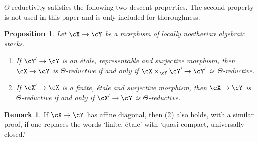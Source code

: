 \documentclass[a4paper]{amsart}
\numberwithin{equation}{section}
\theoremstyle{plain}
\newtheorem{prop}[thm]{Proposition}
\theoremstyle{definition}
\newtheorem{remark}[thm]{Remark}
\begin{document}
$\Theta$-reductivity satisfies the following two descent properties.  The second property is not used in this paper and is only included for thoroughness.

\begin{prop} \label{P:theta-reductiveheta-reductive-descent} Let $\cX \to \cY$ be a morphism of locally noetherian algebraic stacks.
\begin{enumerate}
\item  If $\cY' \to \cY$ is an \'etale, representable and surjective morphism, then $\cX \to \cY$ is $\Theta$-reductive if and only if $\cX \times_{\cY} \cY' \to \cY'$ is $\Theta$-reductive.
\item If $\cX' \to \cX$ is a finite, \'etale and surjective morphism, then $\cX \to \cY$ is $\Theta$-reductive if and only if $\cX' \to \cY$ is $\Theta$-reductive.
\end{enumerate}
\end{prop}

\begin{remark} If $\cX \to \cY$ has affine diagonal, then (2) also holds, with a similar proof, if one replaces the words `finite, \'etale' with `quasi-compact, universally closed.'
\end{remark}
\end{document}
